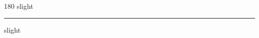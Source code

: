 
\begin{frame}
\begin{center}
\begin{turn}{180}
{\fontsize{2.5cm}{1em}\selectfont slight}
\end{turn}
\vspace{1em}\par  
\hrule
\vspace{1em}\par  
{\fontsize{2.5cm}{1em}\selectfont slight}
\end{center}
\end{frame}
